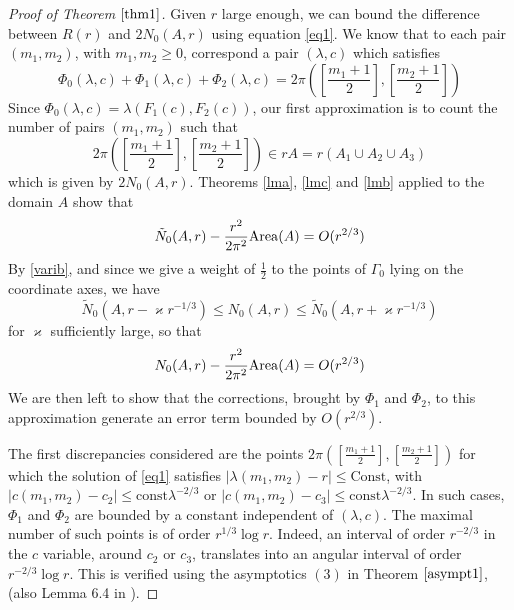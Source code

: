 \documentclass[12pt]{amsart}
\numberwithin{equation}{subsection}
\theoremstyle{definition}
\theoremstyle{plain}
\begin{document}
\begin{proof}[Proof of Theorem $\ref{thm1}$]
Given $r$ large enough, we can bound the difference between $R(r)$ and $2 N_{0}(A, r)$ using equation \eqref{eq1}.
We know that to each pair $(m_1,m_2)$, with $m_1,m_2 \geq 0$, correspond a pair $(\lambda,c)$ which satisfies
\[
\Phi_0(\lambda,c) + \Phi_1(\lambda,c) + \Phi_2(\lambda,c) = 2 \pi \left( \left[ \frac{m_1+1}{2} \right],\left[ \frac{m_2+1}{2}\right] \right)
\]
Since $\Phi_0(\lambda,c)=\lambda(F_1(c), F_2(c))$, our first approximation is to count the number of pairs $(m_1,m_2)$
such that
\[
2 \pi \left( \left[ \frac{m_1+1}{2} \right],\left[ \frac{m_2+1}{2}\right] \right) \in r A
= r (A_1 \cup A_2 \cup A_3)
\]
which is given by $2N_0(A,r)$.
Theorems \ref{lma}, \ref{lmc} and \ref{lmb} applied to the domain $A$ show that
\[
\tilde{N}_{0}(A, r)- \frac{r^2}{2\pi^2} {{\rm {Area}}}(A)  =O(r^{2/3})
\]
By \eqref{varib}, and since we give a weight of $\frac{1}{2}$ to the points of $\Gamma_0$ lying on the coordinate axes, we have
\begin{equation}
\label{sandwich}
\tilde{N}_{0}(A, r- \varkappa r^{-1/3})
\leq N_{0}(A, r)
\leq \tilde{N}_{0}(A, r+ \varkappa r^{-1/3})
\end{equation}
for $\varkappa$ sufficiently large, so that
\[
N_{0}(A, r) - \frac{ r^2}{2 \pi^2}{{\rm {Area}}}(A) =O(r^{2/3})
\]
We are then left to show that the corrections, brought by $\Phi_1$ and $\Phi_2$, to this approximation
generate an error term bounded by $O(r^{2/3})$.

The first discrepancies considered are the points $2 \pi \left( \left[ \frac{m_1+1}{2} \right],\left[ \frac{m_2+1}{2}\right] \right)$ for which
the solution of \eqref{eq1} satisfies $|\lambda(m_1,m_2)-r| \leq \text{Const}$, with $|c(m_1,m_2) - c_2| \leq \text{const} \lambda^{-2/3}$ or $|c(m_1,m_2) - c_3| \leq \text{const} \lambda^{-2/3}$.
In such cases, $\Phi_1$ and $\Phi_2$ are bounded by a constant independent of $(\lambda,c)$.
The maximal number of such points is of order $r^{1/3} \log r$. Indeed, an interval of order $r^{-2/3}$ in the $c$ variable,
around $c_2$ or $c_3$, translates into an angular
interval of order $r^{-2/3} \log r$. This is verified using the asymptotics $(3)$ in Theorem $\ref{asympt1}$, (also Lemma 6.4 in \cite{1}).


\end{proof}
\end{document}
